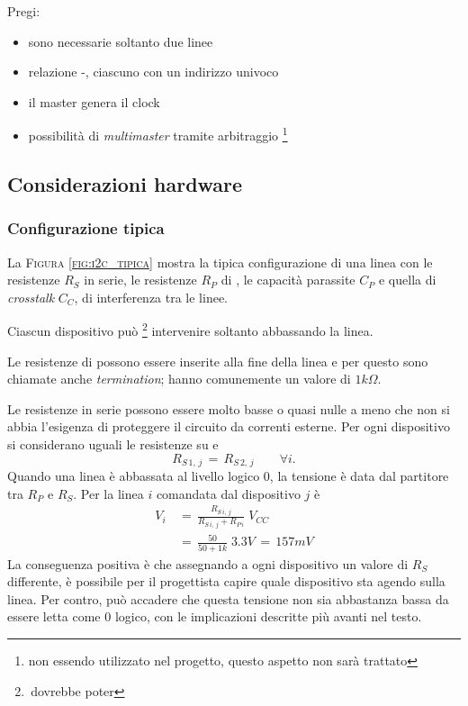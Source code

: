     Pregi:
\begin{itemize}
	\item {sono necessarie soltanto due linee}
	\item {relazione {\master}-{\slave}, ciascuno con un indirizzo univoco}
	\item {il master genera il clock}
	\item {
    	possibilità di \textit{multimaster} tramite arbitraggio
   		\footnote {
        	non essendo utilizzato nel progetto,
        	questo aspetto non sarà trattato
        }
	}
\end{itemize}

\subsection{Considerazioni hardware}

\subsubsection{Configurazione tipica}
La \textsc{Figura \ref{fig:i2c_tipica}}
mostra la tipica configurazione di una linea {\iic}
con le resistenze $R_S$ in serie,
le resistenze $R_P$ di \pullup,
le capacità parassite $C_P$
e quella di \textit{crosstalk} $C_C$, di interferenza tra le linee.

Ciascun dispositivo può \footnote{\,dovrebbe poter}
intervenire soltanto abbassando la linea.

Le resistenze di {\pullup} possono essere inserite alla fine della linea
e per questo sono chiamate anche \textit{{\iic} termination};
hanno comunemente un valore di $1k\Omega$.

Le resistenze in serie possono essere molto basse o quasi nulle
a meno che non si abbia l'esigenza di proteggere il circuito da correnti esterne.
Per ogni dispositivo si considerano uguali le resistenze su {\sda} e {\scl}
\begin{equation}
	R_{S\,1,\,j}\,=\,R_{S\,2,\,j}\qquad \forall i.
\label{eqn:rs}
\end{equation}
Quando una linea è abbassata al livello logico \textsc{0},
la tensione è data dal partitore tra $R_P$ e $R_S$.
Per la linea $i$ comandata dal dispositivo $j$ è
\begin{align}
	V_{i}\,&=\,\frac{R_{S\,i,\,j}}{R_{S\,i,\,j}+R_{P\,i}}\;V_{CC} \\
    & =\,\frac{50}{50+1k}\;3.3V \,=\,157mV
\label{eqn:partitore}
\end{align}
La conseguenza positiva è che assegnando a ogni dispositivo un valore di $R_S$ differente,
è possibile per il progettista capire quale dispositivo sta agendo sulla linea.
Per contro, può accadere che questa tensione non sia abbastanza bassa da essere letta come \textsc{0} logico,
con le implicazioni descritte più avanti nel testo.

